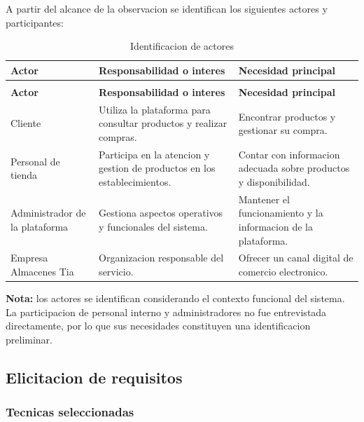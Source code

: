 \documentclass[12pt,a4paper]{article}
\renewcommand{\arraystretch}{1.17}
\begin{document}
A partir del alcance de la observacion se identifican
los siguientes actores y participantes:

\begingroup
\footnotesize
\setlength{\tabcolsep}{3pt}
\renewcommand{\arraystretch}{1.25}
\begin{longtable}{|>{\raggedright\arraybackslash}p{2.65cm}|>{\raggedright\arraybackslash}p{6.05cm}|>{\raggedright\arraybackslash}p{5.65cm}|}
\caption{Identificacion de actores}\\
\hline
\textbf{Actor} &
\textbf{Responsabilidad o interes} &
\textbf{Necesidad principal} \\
\hline
\endfirsthead
\multicolumn{3}{c}{\textit{Continuación: Identificacion de actores}}\\
\hline
\textbf{Actor} &
\textbf{Responsabilidad o interes} &
\textbf{Necesidad principal} \\
\hline
\endhead
Cliente &
Utiliza la plataforma para consultar productos
y realizar compras. &
Encontrar productos y gestionar su compra. \\
\hline
Personal de tienda &
Participa en la atencion y gestion de productos
en los establecimientos. &
Contar con informacion adecuada sobre productos
y disponibilidad. \\
\hline
Administrador de la plataforma &
Gestiona aspectos operativos y funcionales
del sistema. &
Mantener el funcionamiento y la informacion
de la plataforma. \\
\hline
Empresa Almacenes Tia &
Organizacion responsable del servicio. &
Ofrecer un canal digital de comercio electronico. \\
\hline
\end{longtable}
\endgroup

\textbf{Nota:} los actores se identifican considerando
el contexto funcional del sistema. La participacion
de personal interno y administradores no fue
entrevistada directamente, por lo que sus necesidades
constituyen una identificacion preliminar.

\subsection{Elicitacion de requisitos}

\subsubsection{Tecnicas seleccionadas}
\end{document}
